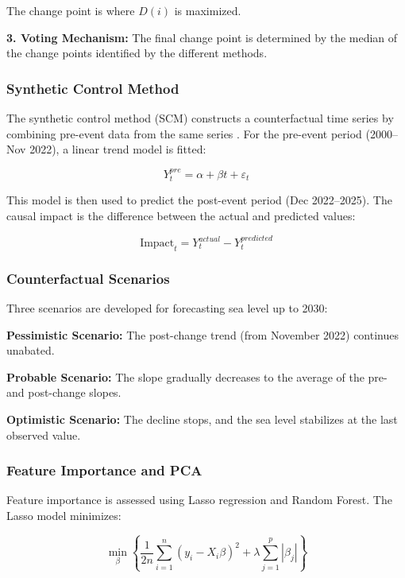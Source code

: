 \documentclass[12pt,a4paper,twocolumn]{article}
\begin{document}
The change point is where $D(i)$ is maximized.

\textbf{3. Voting Mechanism:} The final change point is determined by the median of the change points identified by the different methods.

\subsubsection{Synthetic Control Method}

The synthetic control method (SCM) constructs a counterfactual time series by combining pre-event data from the same series \citep{abadie2010}. For the pre-event period (2000–Nov 2022), a linear trend model is fitted:

\begin{equation}
Y_t^{pre} = \alpha + \beta t + \varepsilon_t
\end{equation}

This model is then used to predict the post-event period (Dec 2022–2025). The causal impact is the difference between the actual and predicted values:

\begin{equation}
\text{Impact}_t = Y_t^{actual} - Y_t^{predicted}
\end{equation}

\subsubsection{Counterfactual Scenarios}

Three scenarios are developed for forecasting sea level up to 2030:

\textbf{Pessimistic Scenario:} The post-change trend (from November 2022) continues unabated.

\textbf{Probable Scenario:} The slope gradually decreases to the average of the pre- and post-change slopes.

\textbf{Optimistic Scenario:} The decline stops, and the sea level stabilizes at the last observed value.

\subsubsection{Feature Importance and PCA}

Feature importance is assessed using Lasso regression and Random Forest. The Lasso model minimizes:

\begin{equation}
\min_{\beta} \left\{ \frac{1}{2n} \sum_{i=1}^{n} (y_i - X_i \beta)^2 + \lambda \sum_{j=1}^{p} |\beta_j| \right\}
\end{equation}
\end{document}
